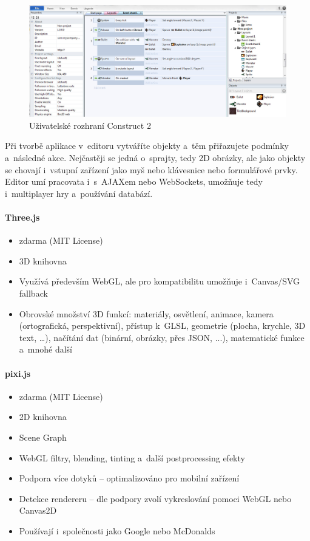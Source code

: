 \documentclass[12pt,a4paper,titlepage,final]{report}
\begin{document}
\begin{figure}[ht]
\begin{center}
\includegraphics[width=14cm]{images/construct2.jpg}
\caption{Uživatelské rozhraní Construct 2}
\label{fig:theory}
\end{center}
\end{figure}

Při tvorbě aplikace v~editoru vytváříte objekty a~těm přiřazujete podmínky a~následné akce. Nejčastěji se jedná o~sprajty, tedy 2D obrázky, ale jako objekty se chovají i~vstupní zařízení jako myš nebo klávesnice nebo formulářové prvky. Editor umí pracovata i~s~AJAXem nebo WebSockets, umožňuje tedy i~multiplayer hry a~používání databází.

\paragraph{Three.js} \cite{threejs}

\begin{itemize}
	\item zdarma (MIT License)
	\item 3D knihovna
	\item Využívá především WebGL, ale pro kompatibilitu umožňuje i~Canvas/SVG fallback
	\item Obrovské množství 3D funkcí: materiály, osvětlení, animace, kamera (ortografická, perspektivní), přístup k~GLSL, geometrie (plocha, krychle, 3D text, \dots), načítání dat (binární, obrázky, přes JSON, ...), matematické funkce a~mnohé další	
\end{itemize}

\paragraph{pixi.js} \cite{pixi}

\begin{itemize}
	\item zdarma (MIT License)
	\item 2D knihovna
	\item Scene Graph
	\item WebGL filtry, blending, tinting a~další postprocessing efekty
	\item Podpora více dotyků -- optimalizováno pro mobilní zařízení
	\item Detekce rendereru -- dle podpory zvolí vykreslování pomoci WebGL nebo Canvas2D
	\item Používají i~společnosti jako Google nebo McDonalds
\end{itemize}
\end{document}
